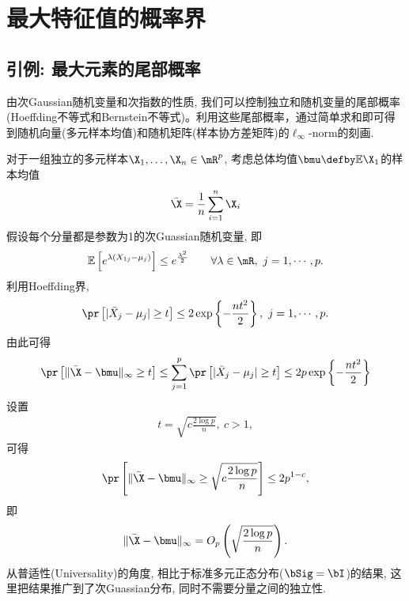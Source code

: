 \section{最大特征值的概率界}


\subsection{引例: 最大元素的尾部概率}
由次Gaussian随机变量和次指数的性质, 我们可以控制独立和随机变量的尾部概率(Hoeffding不等式和Bernstein不等式)。利用这些尾部概率，通过简单求和即可得到随机向量(多元样本均值)和随机矩阵(样本协方差矩阵)的$\ell_\infty$-norm的刻画.

\begin{exm}
对于一组独立的多元样本$\X_1,\ldots,\X_n \in \mR^p$, 考虑总体均值$\bmu\defby \E \X_1$的样本均值
\begin{align*}
    \bar{\X}=\frac{1}{n}\sum_{i=1}^n \X_i
\end{align*}
假设每个分量都是参数为1的次Guassian随机变量, 即
\begin{align*}
    \E\left[e^{\lambda (X_{1j}-\mu_j)}\right] \leq e^{\frac{\lambda^{2}}{2}} \qquad \forall \lambda \in \mR,~j=1,\cdots,p.
\end{align*}
利用Hoeffding界,
  \begin{align*}
    \pr\left[|\bar{X}_j-\mu_j| \geq t\right] \leq  2 \exp \left\{-\frac{n t^2}{2}\right\},~j=1,\cdots,p.
  \end{align*}
  由此可得
 \begin{align*}
    \pr\left[\|\bar{\X}-\bmu\|_\infty \geq t  \right] \leq \sum_{j=1}^p   \pr\left[|\bar{X}_j-\mu_j| \geq t\right] \leq 2p \exp \left\{-\frac{n t^2}{2 }\right\}
 \end{align*} 
 设置
 \begin{align*}
    t=\sqrt{c \frac{2\log p}{n}},~c>1,
 \end{align*}
 可得
 \begin{align*}
    \pr\left[\|\bar{\X}-\bmu\|_\infty \geq \sqrt{c \frac{2\log p}{n}} \right] \leq 2p^{1-c},
 \end{align*}
即
\begin{align*}
    \|\bar{\X}-\bmu\|_\infty=O_p\left( \sqrt{\frac{2\log p}{n}}  \right). 
\end{align*}
 从普适性(Universality)的角度, 相比于标准多元正态分布($\bSig=\bI$)的结果, 这里把结果推广到了次Guassian分布, 同时不需要分量之间的独立性.
\end{exm}




